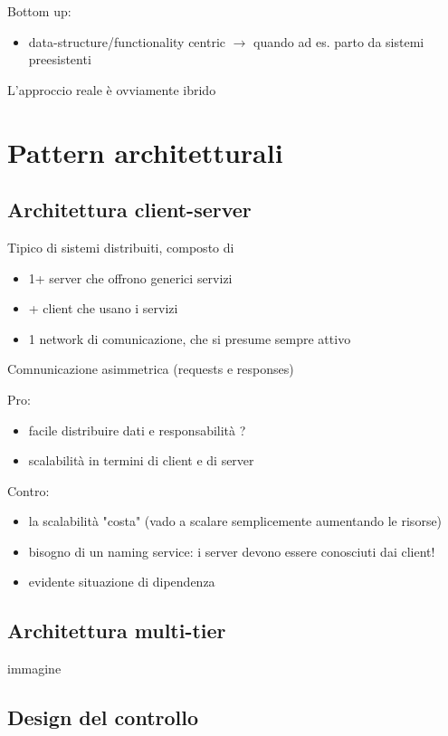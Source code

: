 Bottom up:
\begin{itemize}
  \item data-structure/functionality centric $\rightarrow$ quando ad es. parto da sistemi preesistenti
\end{itemize}

L'approccio reale \`e ovviamente ibrido

\section{Pattern architetturali}

\subsection{Architettura client-server}

Tipico di sistemi distribuiti, composto di 
\begin{itemize}
  \item 1+ server che offrono generici servizi
  \item + client che usano i servizi
  \item 1 network di comunicazione, che si presume sempre attivo
\end{itemize}

Comnunicazione asimmetrica (requests e responses)

Pro:
\begin{itemize}
  \item facile distribuire dati e responsabilit\`a ?
  \item scalabilit\`a in termini di client e di server
\end{itemize}

Contro:
\begin{itemize}
  \item la scalabilit\`a "costa" (vado a scalare semplicemente aumentando le risorse)
  \item bisogno di un naming service: i server devono essere conosciuti dai client!
  \item evidente situazione di dipendenza
\end{itemize}

\subsection{Architettura multi-tier}

immagine

\subsection{Design del controllo}

